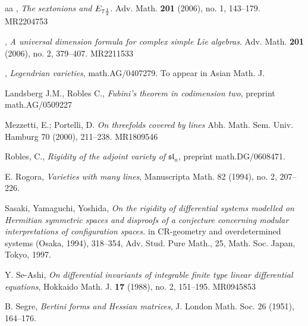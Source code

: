 \documentclass[11pt]{amsart}
\theoremstyle{definition}
\theoremstyle{remark}
\numberwithin{equation}{section}
\def\fsl{{\mathfrak {sl}}}
\begin{document}
\begin{thebibliography}{aa}
 \bysame,   {\it  The sextonions and $E\sb {7\frac 12}$}.  Adv. Math.  {\bf 201}  (2006),  no. 1, 143--179. MR2204753


 \bysame,  {\it  A universal dimension formula for complex simple Lie algebras}.  Adv. Math.  {\bf 201}  (2006),  no. 2, 379--407. MR2211533


 \bysame, 
{\it Legendrian varieties}, 
  math.AG/0407279. To appear in Asian Math. J.

Landsberg J.M., Robles C., 
{\it Fubini's theorem in codimension two}, 
preprint  math.AG/0509227

   Mezzetti, E.; Portelli, D. {\it On threefolds covered by lines}  Abh. Math. Sem. Univ. Hamburg  70  (2000), 211--238. 
MR1809546

Robles, C., {\it Rigidity of the adjoint variety of $\fsl_n$}, preprint
math.DG/0608471.

E. Rogora, {\it Varieties with many lines},  
Manuscripta Math.  82  (1994),  no. 2, 207--226.

Sasaki,   Yamaguchi,  Yoshida, 
{\it On the rigidity of differential systems modelled on Hermitian symmetric spaces and disproofs of a conjecture concerning modular interpretations of configuration spaces.} in
CR-geometry and overdetermined systems (Osaka, 1994), 318--354,
Adv. Stud. Pure Math., 25,
Math. Soc. Japan, Tokyo, 1997. 

Y. Se-Ashi,{\it 
On differential invariants of integrable finite type linear differential equations},
Hokkaido Math. J. {\bf 17} (1988), no. 2, 151--195.
MR0945853  


B. Segre, {\it Bertini forms and Hessian matrices},
{  J. London Math. Soc.} 26 (1951), 164--176.


\end{thebibliography}
\end{document}
